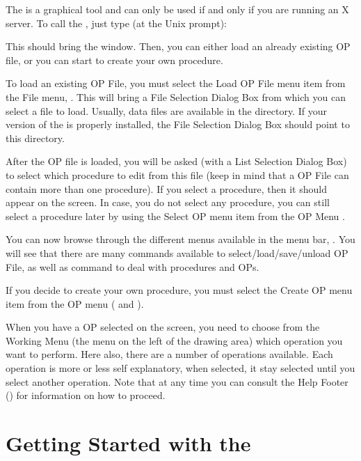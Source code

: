 The \OPE{} is a graphical tool and can only be used if and only if you are
running an X server. To call the \OPE{}, just type (at the Unix prompt):


This should bring the \OPE{} window. Then, you can either load an already
existing OP file, or you can start to create your own procedure.

To load an existing OP File, you must select the Load OP File menu item
from the File menu, . This will bring a File Selection
Dialog Box from which you can select a file to load. Usually, data files
are available in the  directory. If your version
of the \OPE{} is properly installed, the File Selection Dialog Box should
point to this directory.

After the OP file is loaded, you will be asked (with a List Selection
Dialog Box) to select which procedure to edit from this file (keep in mind
that a OP File can contain more than one procedure). If you select a
procedure, then it should appear on the screen. In case, you do not select
any procedure, you can still select a procedure later by using the Select
OP menu item from the OP Menu .

You can now browse through the different menus available in the menu bar,
. You will see that there are many
commands available to select/load/save/unload OP File, as well as command
to
deal with procedures and OPs.

If you decide to create your own procedure, you must select the Create OP
menu item from the OP menu ( and ).

When you have a OP selected on the screen, you need to choose from the
Working Menu (the menu on the left of the drawing area) which operation
you want to perform. Here also, there are a number of operations
available. Each operation is more or less self explanatory, when
selected, it stay selected until you select another operation. Note that
at any time you can consult the Help Footer () for information on how to proceed.

\section{Getting Started with the \XPK{}}

